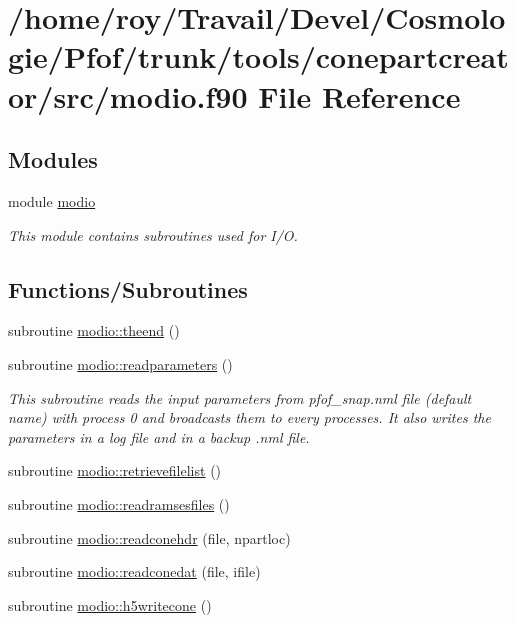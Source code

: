 \hypertarget{tools_2conepartcreator_2src_2modio_8f90}{}\section{/home/roy/\+Travail/\+Devel/\+Cosmologie/\+Pfof/trunk/tools/conepartcreator/src/modio.f90 File Reference}
\label{tools_2conepartcreator_2src_2modio_8f90}
\subsection*{Modules}
\begin{DoxyCompactItemize}
\item 
module \hyperlink{namespacemodio}{modio}
\begin{DoxyCompactList}\small\item\em This module contains subroutines used for I/O. \end{DoxyCompactList}\end{DoxyCompactItemize}
\subsection*{Functions/\+Subroutines}
\begin{DoxyCompactItemize}
\item 
subroutine \hyperlink{namespacemodio_a2688770b2d08498c14ef3212e61d74bf}{modio\+::theend} ()
\item 
subroutine \hyperlink{namespacemodio_aa5e6b5f45cf8cfc091e8e7ff25a97c68}{modio\+::readparameters} ()
\begin{DoxyCompactList}\small\item\em This subroutine reads the input parameters from pfof\+\_\+snap.\+nml file (default name) with process 0 and broadcasts them to every processes. It also writes the parameters in a log file and in a backup .nml file. \end{DoxyCompactList}\item 
subroutine \hyperlink{namespacemodio_a49a42a212fba0853ef61f4f3360e6cb8}{modio\+::retrievefilelist} ()
\item 
subroutine \hyperlink{namespacemodio_a65b2a30853dd9ec7641c578cb220a3fe}{modio\+::readramsesfiles} ()
\item 
subroutine \hyperlink{namespacemodio_ac8d9a9aea4bf8df27247c29c816df78c}{modio\+::readconehdr} (file, npartloc)
\item 
subroutine \hyperlink{namespacemodio_a15ba57a85caae734e0b917de58988acd}{modio\+::readconedat} (file, ifile)
\item 
subroutine \hyperlink{namespacemodio_a756eae4b92791daadf54d68094c44c8b}{modio\+::h5writecone} ()
\end{DoxyCompactItemize}
